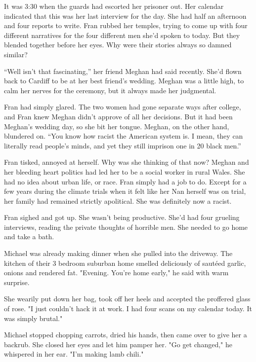 \documentclass{article}
\begin{document}
It was 3:30 when the guards had escorted her prisoner out. Her calendar indicated that this was her last interview for the day. She had half an afternoon and four reports to write. Fran rubbed her temples, trying to come up with four different narratives for the four different men she’d spoken to today. But they blended together before her eyes. Why were their stories always so damned similar?

“Well isn’t that fascinating,” her friend Meghan had said recently. She’d flown back to Cardiff to be at her best friend’s wedding. Meghan was a little high, to calm her nerves for the ceremony, but it always made her judgmental.

Fran had simply glared. The two women had gone separate ways after college, and Fran knew Meghan didn’t approve of all her decisions. But it had been Meghan’s wedding day, so she bit her tongue. Meghan, on the other hand, blundered on. “You know how racist the American system is. I mean, they can literally read people’s minds, and yet they still imprison one in 20 black men.”

Fran tisked, annoyed at herself.  Why was she thinking of that now? Meghan and her bleeding heart politics had led her to be a social worker in rural Wales. She had no idea about urban life, or race. Fran simply had a job to do. Except for a few years during the climate trials when it felt like her Nan herself was on trial, her family had remained strictly apolitical. She was definitely now a racist.

Fran sighed and got up. She wasn’t being productive. She’d had four grueling interviews, reading the private thoughts of horrible men. She needed to go home and take a bath.

\vspace{.5 cm}

Michael was already making dinner when she pulled into the driveway. The kitchen of their 3 bedroom suburban home smelled deliciously of sautéed garlic, onions and rendered fat. "Evening. You're home early," he said with warm surprise.

She wearily put down her bag, took off her heels and accepted the proffered glass of rose. "I just couldn't hack it at work. I had four scans on my calendar today. It was simply brutal."

Michael stopped chopping carrots, dried his hands, then came over to give her a backrub. She closed her eyes and let him pamper her. "Go get changed," he whispered in her ear. "I'm making lamb chili."
\end{document}
